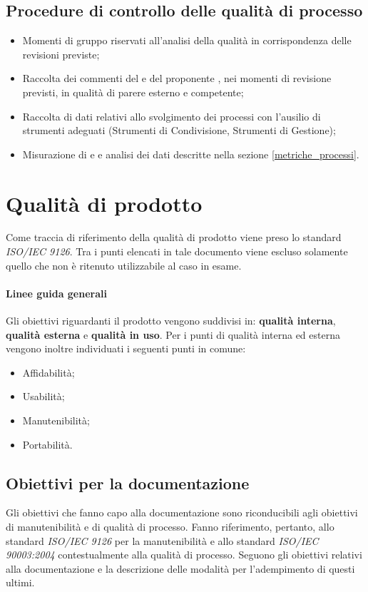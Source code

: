 \documentclass[12pt,a4paper]{article}
\begin{document}
\subsection{Procedure di controllo delle qualità di processo}
\begin{itemize}
	\item Momenti di gruppo riservati all'analisi della qualità in corrispondenza delle revisioni previste;
	\item Raccolta dei commenti del \Vardanega{} e del proponente \Zucchetti{}, nei momenti di revisione previsti, in qualità di parere esterno e competente;
	\item Raccolta di dati relativi allo svolgimento dei processi con l'ausilio di strumenti adeguati (Strumenti di Condivisione, Strumenti di Gestione);
	\item Misurazione di  e  e analisi dei dati descritte nella sezione \ref{metriche_processi}.	
\end{itemize}

\newpage

\section{Qualità di prodotto}
Come traccia di riferimento della qualità di prodotto viene preso lo standard \textit{ISO/IEC 9126}. Tra i punti elencati in tale documento viene escluso solamente quello che non è ritenuto utilizzabile al caso in esame.
\paragraph{Linee guida generali}
Gli obiettivi riguardanti il prodotto vengono suddivisi in: \textbf{qualità interna}, \textbf{qualità esterna} e \textbf{qualità in uso}.
Per i punti di qualità interna ed esterna vengono inoltre individuati i seguenti punti in comune:
\begin{itemize}
	\item Affidabilità;
	\item Usabilità;
	\item Manutenibilità;
	\item Portabilità.
\end{itemize}

\subsection{Obiettivi per la documentazione}
Gli obiettivi che fanno capo alla documentazione sono riconducibili agli obiettivi di manutenibilità e di qualità di processo.
Fanno riferimento, pertanto, allo standard \textit{ISO/IEC 9126} per la manutenibilità e allo standard \textit{ISO/IEC 90003:2004} contestualmente alla qualità di processo.
Seguono gli obiettivi relativi alla documentazione e la descrizione  delle modalità per l'adempimento di questi ultimi.
\end{document}
